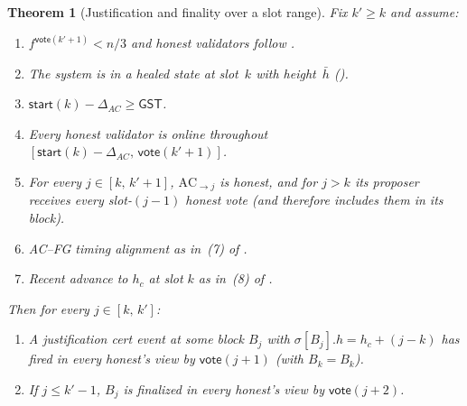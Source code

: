 \documentclass{article}
\newcommand{\start}{\mathsf{start}}
\newcommand{\vote}{\mathsf{vote}}
\newcommand{\comm}[1]{\bar{#1}}
\theoremstyle{plain}
\newtheorem{theorem}{Theorem}
\theoremstyle{definition}
\theoremstyle{remark}
\newcommand{\GST}{\ensuremath{\mathsf{GST}}}
\begin{document}
\begin{theorem}[Justification and finality over a slot range]\label{rev:thm:per-round-range}
Fix $k' \geq k$ and assume:
\begin{enumerate}
  \item $f^{\vote(k'+1)} < n/3$ and honest validators follow .
  \item The system is in a healed state at slot~$k$ with height~$\comm{h}$ ().
  \item $\start(k) - \Delta_{AC} \geq \GST$.
  \item Every honest validator is online throughout $[\start(k) - \Delta_{AC},\, \vote(k'+1)]$.
  \item For every $j \in [k,\, k'+1]$, $\mathrm{AC}_{\to j}$ is honest, and for $j > k$ its proposer receives every slot-$(j{-}1)$ honest vote (and therefore includes them in its block).
  \item AC--FG timing alignment as in~(7) of .
  \item Recent advance to $h_c$ at slot $k$ as in~(8) of .
\end{enumerate}

Then for every $j \in [k,\, k']$:
\begin{enumerate}
  \item[\textnormal{(T1)}] A justification cert event at some block $B_j$ with $\sigma[B_j].h = h_c + (j - k)$ has fired in every honest's view by $\vote(j+1)$ (with $B_k = B_k$).
  \item[\textnormal{(T2)}] If $j \leq k' - 1$, $B_j$ is finalized in every honest's view by $\vote(j+2)$.
\end{enumerate}
\end{theorem}
\end{document}
